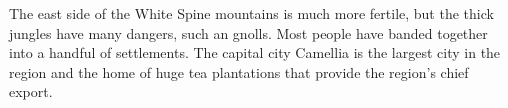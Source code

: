 The east side of the White Spine mountains is much more fertile, but the thick jungles have many dangers, such an gnolls.
Most people have banded together into a handful of settlements.
The capital city Camellia is the largest city in the region and the home of huge tea plantations that provide the region's chief export.
